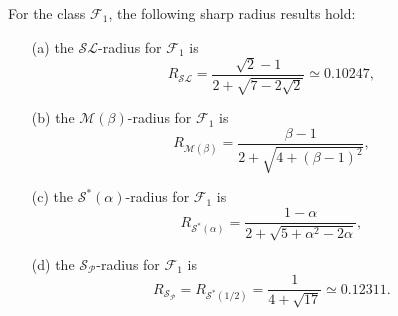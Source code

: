\documentclass{amsart}
\begin{document}
\begin{theorem}\label{th7} For the class $\mathcal{F}_1$,   the following sharp radius results hold:
 \begin{enumerate}
 \item[(a)]\label{i3} the $ {\mathcal{SL}} $-radius for $\mathcal{F}_1$ is \[R_{\mathcal{SL}}= \frac{\sqrt2-1}{2+\sqrt{7-2\sqrt2}}\simeq0.10247,\]
 \item[(b)]\label{i4}the $ {\mathcal{M}(\beta)} $-radius for $\mathcal{F}_1$ is \[R_{\mathcal{M}(\beta)}= \frac{\beta-1}{2+\sqrt{4+(\beta-1)^2}},\]
 \item[(c)]\label{i27}  the ${\mathcal{S}^*(\alpha)} $-radius for $\mathcal{F}_1$ is \[R_{\mathcal{S}^*(\alpha)}= \frac{ 1-\alpha }{2+\sqrt{5+\alpha ^2-2\alpha }},\]
 \item[(d)]\label{i5}   the ${\mathcal{S}_{\mathcal{P}}} $-radius for $\mathcal{F}_1$ is \[R_{\mathcal{S}_{\mathcal{P}}}=R_{\mathcal{S}^*{( 1/2 )}}=\frac{ 1}{4+\sqrt{17}}\simeq0.12311.\]
 \end{enumerate}
\end{theorem}
\end{document}
